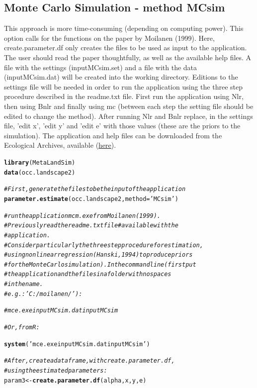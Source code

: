 \documentclass{article}\usepackage[]{graphicx}\usepackage[]{xcolor}
\makeatletter
\newcommand{\hlsng}[1]{\textcolor[rgb]{0.192,0.494,0.8}{#1}}%
\newcommand{\hlcom}[1]{\textcolor[rgb]{0.678,0.584,0.686}{\textit{#1}}}%
\newcommand{\hldef}[1]{\textcolor[rgb]{0.345,0.345,0.345}{#1}}%
\newcommand{\hlkwb}[1]{\textcolor[rgb]{0.69,0.353,0.396}{#1}}%
\newcommand{\hlkwc}[1]{\textcolor[rgb]{0.333,0.667,0.333}{#1}}%
\newcommand{\hlkwd}[1]{\textcolor[rgb]{0.737,0.353,0.396}{\textbf{#1}}}%
\newenvironment{kframe}{%
 \def\at@end@of@kframe{}%
 \ifinner\ifhmode%
  \def\at@end@of@kframe{\end{minipage}}%
  \begin{minipage}{\columnwidth}%
 \fi\fi%
 \def\FrameCommand##1{\hskip\@totalleftmargin \hskip-\fboxsep
 \colorbox{shadecolor}{##1}\hskip-\fboxsep
     \hskip-\linewidth \hskip-\@totalleftmargin \hskip\columnwidth}%
 \MakeFramed {\advance\hsize-\width
   \@totalleftmargin\z@ \linewidth\hsize
   \@setminipage}}%
 {\par\unskip\endMakeFramed%
 \at@end@of@kframe}
\newenvironment{knitrout}{}{} %
\makeatother
\begin{document}
\subsection{Monte Carlo Simulation - method MCsim}

This approach is more time-consuming (depending on computing power). This option calls for the functions on the paper by Moilanen (1999). Here, create.parameter.df only creates the files to be used as input to the application. The user should read the paper thoughtfully, as well as the available help files. A file with the settings (inputMCsim.set) and a file with the data (inputMCsim.dat) will be created into the working directory. Editions to the settings file will be needed in order to run the application using the three step procedure described in the readme.txt file. First run the application using Nlr, then using Bnlr and finally using mc (between each step the setting file should be edited to change the method). After running Nlr and Bnlr replace, in the settings file, 'edit x', 'edit y' and 'edit e' with those values (these are the priors to the simulation).  
The application and help files can be downloaded from the Ecological Archives, available (\href{http://www.esapubs.org/archive/ecol/E080/003/}{here}).

\begin{knitrout}
\color{fgcolor}\begin{kframe}
\begin{alltt}
\hlkwd{library}\hldef{(MetaLandSim)}
\hlkwd{data}\hldef{(occ.landscape2)}

\hlcom{#First, generate the files to be the input of the application}
\hlkwd{parameter.estimate} \hldef{(occ.landscape2,} \hlkwc{method}\hldef{=}\hlsng{'MCsim'}\hldef{)}

\hlcom{#run the application mcm.exe from Moilanen (1999). }
\hlcom{#Previously read the readme.txt file #available with the }
\hlcom{#application. }
\hlcom{#Consider particularly the three step procedure for estimation, }
\hlcom{#using nonlinear regression (Hanski, 1994) to produce priors }
\hlcom{#for the Monte Carlo simulation). In the command line (first put }
\hlcom{#the application and the files in a folder with no spaces }
\hlcom{#in the name. }
\hlcom{#e.g.: 'C:/moilanen/'):}

\hlcom{#mce.exe inputMCsim.dat inputMCsim}

\hlcom{#Or, from R:}

\hlkwd{system}\hldef{(}\hlsng{'mce.exe inputMCsim.dat inputMCsim'}\hldef{)}


\hlcom{#After, create a data frame, with create.parameter.df, }
\hlcom{#using the estimated parameters:}
\hldef{param3} \hlkwb{<-} \hlkwd{create.parameter.df}\hldef{(alpha, x, y, e)}
\end{alltt}
\end{kframe}
\end{knitrout}
\end{document}

